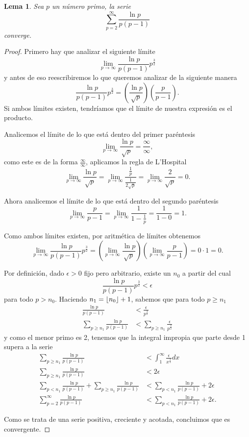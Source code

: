 \documentclass{article}
\DeclarePairedDelimiter\floor{\lfloor}{\rfloor}
\newtheorem{lemma}[theorem]{Lema}
\theoremstyle{definition}
\theoremstyle{remark}
\begin{document}
\begin{lemma}
Sea $p$ un n\'umero primo, la serie
$$\sum_{p = 2}^{\infty} \frac{\ln p}{p (p - 1)}$$
converge.
\end{lemma}

\begin{proof}
Primero hay que analizar el siguiente l\'imite
$$\lim_{p \to \infty} \frac{\ln p}{p (p - 1)} p^\frac{3}{2}$$
y antes de eso reescribiremos lo que queremos analizar de la siguiente manera
$$\frac{\ln p}{p (p - 1)} p^\frac{3}{2} = \left(\frac{\ln p}{\sqrt{p}}\right)\left(\frac{p}{p - 1}\right).$$
Si ambos l\'imites existen, tendr\'iamos que el l\'imite de nuestra expresi\'on es el producto.

Analicemos el l\'imite de lo que est\'a dentro del primer par\'entesis
$$\lim_{p \to \infty} \frac{\ln p}{\sqrt{p}} = \frac{\infty}{\infty},$$
como este es de la forma $\frac{\infty}{\infty}$, aplicamos la regla de L'Hospital
$$\lim_{p \to \infty} \frac{\ln p}{\sqrt{p}}
= \lim_{p \to \infty}\frac{\frac{1}{p}}{\frac{1}{2\sqrt{p}}}
= \lim_{p \to \infty} \frac{2}{\sqrt{p}} = 0.$$

Ahora analicemos el l\'imite de lo que est\'a dentro del segundo par\'entesis
$$\lim_{p \to \infty} \frac{p}{p - 1}
= \lim_{p \to \infty} \frac{1}{1 - \frac{1}{p}}
= \frac{1}{1 - 0} = 1.$$

Como ambos l\'imites existen, por aritm\'etica de l\'imites obtenemos
$$\lim_{p \to \infty} \frac{\ln p}{p (p - 1)} p^\frac{3}{2}
= \left(\lim_{p \to \infty} \frac{\ln p}{\sqrt{p}}\right)\left(\lim_{p \to \infty} \frac{p}{p - 1}\right)
= 0 \cdot 1 = 0.$$

Por definici\'on, dado $\epsilon > 0$ fijo pero arbitrario, existe un $n_0$ a partir del cual
$$\frac{\ln p}{p (p - 1)} p^\frac{3}{2} < \epsilon$$
para todo $p > n_0$. Haciendo $n_1 = \floor{n_0} + 1$, sabemos que para todo $p \geq n_1$
\begin{align*}
\frac{\ln p}{p (p - 1)} &< \frac{\epsilon}{p^\frac{3}{2}} \\
\sum_{p \geq n_1} \frac{\ln p}{p (p - 1)} &< \sum_{p \geq n_1} \frac{\epsilon}{p^\frac{3}{2}}
\end{align*}
y como el menor primo es 2, tenemos que la integral impropia que parte desde 1 supera a la serie
\begin{align*}
\sum_{p \geq n_1} \frac{\ln p}{p (p - 1)} &< \int_{1}^\infty \frac{\epsilon}{x^\frac{3}{2}} dx \\
\sum_{p \geq n_1} \frac{\ln p}{p (p - 1)} &< 2 \epsilon \\
\sum_{p < n_1} \frac{\ln p}{p (p - 1)} + \sum_{p \geq n_1} \frac{\ln p}{p (p - 1)} &< \sum_{p < n_1} \frac{\ln p}{p (p - 1)} + 2 \epsilon \\
\sum_{p = 2}^\infty \frac{\ln p}{p (p - 1)} &< \sum_{p < n_1} \frac{\ln p}{p (p - 1)} + 2 \epsilon.
\end{align*}

Como se trata de una serie positiva, creciente y acotada, concluimos que es convergente.
\end{proof}
\end{document}
